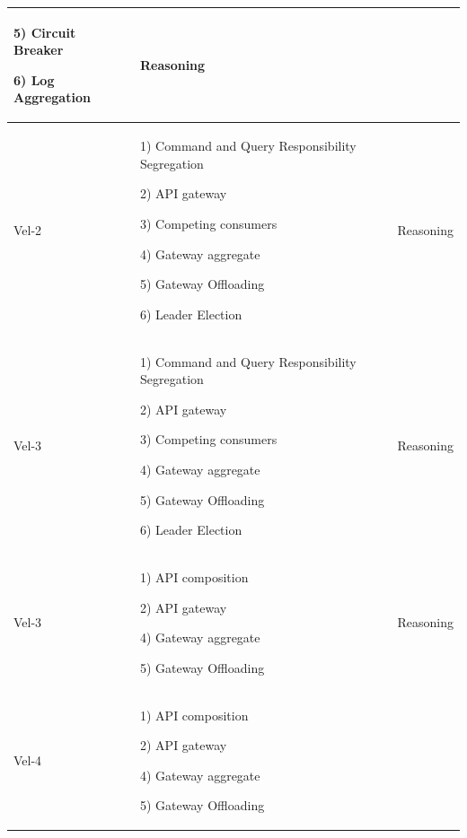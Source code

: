 \documentclass[conference]{IEEEtran}
\begin{document}
\begin{center}
\begin{table}
\begin{tabular}{ | m{2cm} | m{8cm} |  m{2cm} |}
        5) Circuit Breaker 

        6) Log Aggregation  
        
        & Reasoning
        
        \\
        \hline

        Vel-2 &  
    
        1) Command and Query Responsibility Segregation
        
        2) API gateway

        3) Competing consumers

        4) Gateway aggregate

        5) Gateway Offloading

        6) Leader Election 

        & Reasoning

        \\

        \hline

        Vel-3 &  
    
        1) Command and Query Responsibility Segregation
        
        2) API gateway

        3) Competing consumers

        4) Gateway aggregate

        5) Gateway Offloading

        6) Leader Election 

        & Reasoning
        
        \\
        \hline

        \hline

        Vel-3 &  

        1) API composition
        
        2) API gateway

        4) Gateway aggregate

        5) Gateway Offloading

        & Reasoning
        
        \\
        \hline

        Vel-4 &  

        1) API composition
        
        2) API gateway

        4) Gateway aggregate

        5) Gateway Offloading
                

\end{tabular}
\end{table}
\end{center}
\end{document}
